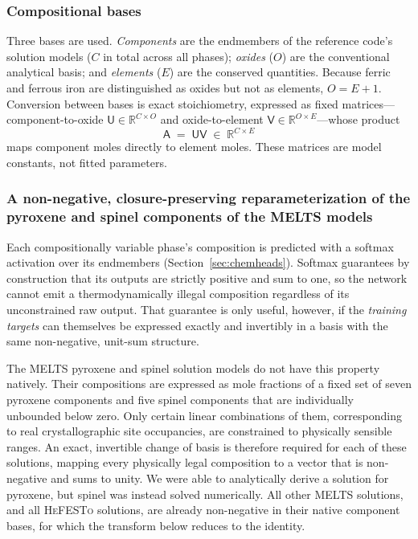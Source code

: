 \subsubsection{Compositional bases}

Three bases are used. \emph{Components} are the endmembers of the reference code's
solution models ($C$ in total across all phases); \emph{oxides} ($O$) are the
conventional analytical basis; and \emph{elements} ($E$) are the conserved
quantities. Because ferric and ferrous iron are distinguished as oxides but not as
elements, $O = E+1$. Conversion between bases is exact stoichiometry, expressed as
fixed matrices---component-to-oxide $\mathsf{U}\in\mathbb{R}^{C\times O}$ and
oxide-to-element $\mathsf{V}\in\mathbb{R}^{O\times E}$---whose product
\begin{equation}
  \mathsf{A} \;=\; \mathsf{U}\mathsf{V} \;\in\; \mathbb{R}^{C\times E}
  \label{eq:stoich}
\end{equation}
maps component moles directly to element moles. These matrices are model constants,
not fitted parameters.

\subsubsection{A non-negative, closure-preserving reparameterization of the
pyroxene and spinel components of the \textsc{MELTS} models}
\label{sec:pxsp}

Each compositionally variable phase's composition is predicted with a softmax
activation over its endmembers (Section~\ref{sec:chemheads}). Softmax guarantees by
construction that its outputs are strictly positive and sum to one, so the network
cannot emit a thermodynamically illegal composition regardless of its unconstrained
raw output. That guarantee is only useful, however, if the \emph{training targets}
can themselves be expressed exactly and invertibly in a basis with the same
non-negative, unit-sum structure.

The \textsc{MELTS} pyroxene and spinel solution models do not have this property
natively. Their compositions are expressed as mole fractions of a fixed set of seven pyroxene 
components and five spinel components that are individually unbounded
below zero. Only certain linear combinations of them, corresponding to real
crystallographic site occupancies, are constrained to physically sensible ranges. An
exact, invertible change of basis is therefore required for each of these solutions,
mapping every physically legal composition to a vector that is non-negative and sums
to unity. We were able to analytically derive a solution for pyroxene, but spinel was instead solved
numerically. All other \textsc{MELTS} solutions, and all \textsc{HeFESTo}
solutions, are already non-negative in their native component bases, for which the
transform below reduces to the identity.

